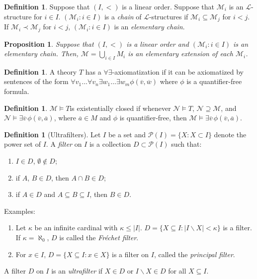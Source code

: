 \documentclass{amsart}
\newtheorem{proposition}[theorem]{Proposition}
\theoremstyle{definition}
\newtheorem{definition}[theorem]{Definition}
\numberwithin{equation}{section}
\begin{document}
\begin{definition}
    Suppose that $(I,<)$ is a linear order.
    Suppose that $\mathcal{M}_i$ is an $\mathcal{L}$-structure for $i \in I$.
    $(\mathcal{M}_i: i \in I)$ is a \emph{chain} of $\mathcal{L}$-structures if $\mathcal{M}_i \subseteq \mathcal{M}_j$ for $i < j$.
    If $\mathcal{M}_i \prec \mathcal{M}_j$ for $i < j$,
    $(\mathcal{M}_i: i \in I)$ is an \emph{elementary chain}.
\end{definition}

\begin{proposition}
    Suppose that $(I,<)$ is a linear order and
    $(\mathcal{M}_i: i \in I)$ is an elementary chain.
    Then, $\mathcal{M} = \bigcup_{i\in I} M_i$ is an elementary extension of each $\mathcal{M}_i$.
\end{proposition}

\begin{definition}
    A theory $T$ has a $\forall\exists$-axiomatization if it can be axiomatized by sentences of the form $\forall v_1\dots\forall v_n \exists w_1\dots \exists w_m \phi(\overline{v},\overline{w})$ 
    where $\phi$ is a quantifier-free formula.
\end{definition}

\begin{definition}
    $\mathcal{M} \models T$is existentially closed 
    if whenever $\mathcal{N} \models T$, $\mathcal{N} \supseteq \mathcal{M}$,
    and $\mathcal{N} \models \exists \overline{v}\, \phi(\overline{v},\overline{a})$,
    where $\overline{a} \in M$ and $\phi$ is quantifier-free,
    then $\mathcal{M} \models \exists \overline{v} \, \phi(\overline{v},\overline{a})$.
\end{definition}

\begin{definition}[Ultrafilters]
    Let $I$ be a set and $\mathcal{P}(I) = \{ X : X \subset I\}$
    denote the power set of $I$.
    A \emph{filter} on $I$ is a collection $D \subset \mathcal{P}(I)$ such that:
    \begin{enumerate}[label = {\roman*)}]
        \item $I \in D$, $\emptyset \not\in D$;
        \item if $A$, $B \in D$, then $A \cap B \in D$;
        \item if $A\in D$ and $A \subseteq B \subseteq I$, then $B \in D$.
    \end{enumerate}
    Examples:
    \begin{enumerate}
        \item Let $\kappa$ be an infinite cardinal with $\kappa \le |I|$. 
        $D = \{ X \subseteq I : |I \backslash X| < \kappa\}$ is a filter.
        If $\kappa = \aleph_0$, $D$ is called the \emph{Fr\'echet filter}.
        \item For $x \in I$, $D = \{X\subseteq I: x\in X\}$ is a filter on $I$, called the \emph{principal filter}.
    \end{enumerate}

    A filter $D$ on $I$ is an \emph{ultrafilter} if $X \in D$ or $I\backslash X \in D$ for all $X \subseteq I$.
\end{definition}
\end{document}
